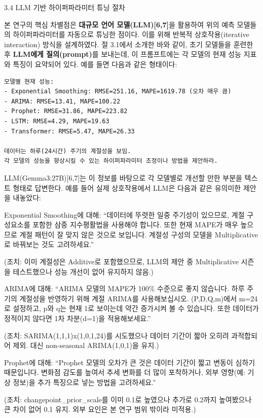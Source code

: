 \documentclass[12pt,ko,a4,]{report}
\begin{document}
3.4 LLM 기반 하이퍼파라미터 튜닝 절차

본 연구의 핵심 차별점은 \textbf{대규모 언어 모델(LLM){[}6,7{]}}을
활용하여 위의 예측 모델들의 하이퍼파라미터를 자동으로 튜닝한 점이다.
이를 위해 반복적 상호작용(iterative interaction) 방식을 설계하였다. 절
3.1에서 소개한 바와 같이, 초기 모델들을 훈련한 후 \textbf{LLM에게
질의(prompt)}를 보내는데, 이 프롬프트에는 각 모델의 현재 성능 지표와
특징이 요약되어 있다. 예를 들면 다음과 같은 형태이다:

\begin{lstlisting}
모델별 현재 성능: 
- Exponential Smoothing: RMSE=251.16, MAPE=1619.78 (오차 매우 큼)  
- ARIMA: RMSE=13.41, MAPE=100.22  
- Prophet: RMSE=31.86, MAPE=223.82  
- LSTM: RMSE=4.29, MAPE=19.63  
- Transformer: RMSE=5.47, MAPE=26.33  

데이터는 하루(24시간) 주기의 계절성을 보임. 
각 모델의 성능을 향상시킬 수 있는 하이퍼파라미터 조정이나 방법을 제안하라.
\end{lstlisting}

LLM(Gemma3:27B){[}6,7{]}는 이 정보를 바탕으로 각 모델별로 개선할 만한
부분을 텍스트 형태로 답변한다. 예를 들어 실제 상호작용에서 LLM은 다음과
같은 유의미한 제안을 내놓았다:

Exponential Smoothing에 대해: ``데이터에 뚜렷한 일중 주기성이 있으므로,
계절 구성요소를 포함한 삼중 지수평활법을 사용해야 합니다. 또한 현재
MAPE가 매우 높으므로 계절 패턴이 잘 맞지 않은 것으로 보입니다. 계절성
구성의 모델을 Multiplicative로 바꿔보는 것도 고려하세요.''

(조치: 이미 계절성은 Additive로 포함했으므로, LLM의 제안 중
Multiplicative 시즌을 테스트했으나 성능 개선이 없어 유지하지 않음.)

ARIMA에 대해: ``ARIMA 모델의 MAPE가 100\% 수준으로 좋지 않습니다. 하루
주기의 계절성을 반영하기 위해 계절 ARIMA를 사용해보십시오. (P,D,Q,m)에서
m=24로 설정하고, p와 q는 현재 1로 보이는데 약간 증가시켜 볼 수 있습니다.
또한 데이터가 정적이지 않다면 1차 차분(d=1)을 적용해보세요.''

(조치: SARIMA(1,1,1)x(1,0,1,24)를 시도했으나 데이터 기간이 짧아 오히려
과적합되어 제외. 대신 non-seasonal ARIMA(1,0,1)을 유지.)

Prophet에 대해: ``Prophet 모델의 오차가 큰 것은 데이터 기간이 짧고
변동이 심하기 때문입니다. 변화점 감도를 높여서 추세 변화를 더 많이
포착하거나, 외부 영향(예: 기상 정보)을 추가 특징으로 넣는 방법을
고려하세요.''

(조치: changepoint\_prior\_scale를 이미 0.1로 높였으나 추가로 0.2까지
높여봤으나 큰 차이 없어 0.1 유지. 외부 요인은 본 연구 범위 밖이라
미적용.)
\end{document}

